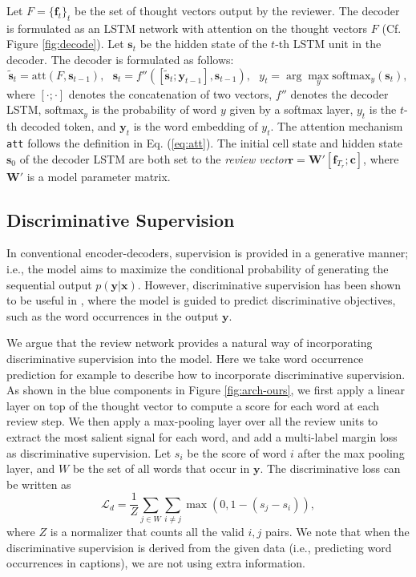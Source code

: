 \documentclass{article}
\begin{document}
Let $F = \{\mathbf{f}_t\}_t$ be the set of thought vectors output by the reviewer. The decoder is formulated as an LSTM network with attention on the thought vectors $F$ (Cf. Figure \ref{fig:decode}). Let $\mathbf{s}_t$ be the hidden state of the $t$-th LSTM unit in the decoder. The decoder is formulated as follows:
\begin{equation}
\tilde{\mathbf{s}}_t = \mbox{att}(F, \mathbf{s}_{t - 1}), ~~~ \mathbf{s}_t = f''([\tilde{\mathbf{s}}_t; \mathbf{y}_{t - 1}], \mathbf{s}_{t - 1}), ~~~ y_t = \arg \max_y \mbox{softmax}_y(\mathbf{s}_t),
\label{eq:loss}
\end{equation}
where $[\cdot; \cdot]$ denotes the concatenation of two vectors, $f''$ denotes the decoder LSTM, $\mbox{softmax}_y$ is the probability of word $y$ given by a softmax layer, $y_t$ is the $t$-th decoded token, and $\mathbf{y}_t$ is the word embedding of $y_t$. The attention mechanism \texttt{att} follows the definition in Eq. (\ref{eq:att}). The initial cell state and hidden state $\mathbf{s}_0$ of the decoder LSTM are both set to the \textit{review vector}$\mathbf{r} = \mathbf{W}'[\mathbf{f}_{T_r}; \mathbf{c}]$, where $\mathbf{W}'$ is a model parameter matrix.

\subsection{Discriminative Supervision}

In conventional encoder-decoders, supervision is provided in a generative manner; i.e., the model aims to maximize the conditional probability of generating the sequential output $p(\mathbf{y} | \mathbf{x})$. However, discriminative supervision has been shown to be useful in \cite{fang2015captions}, where the model is guided to predict discriminative objectives, such as the word occurrences in the output $\mathbf{y}$.

We argue that the review network provides a natural way of incorporating discriminative supervision into the model. Here we take word occurrence prediction for example to describe how to incorporate discriminative supervision. As shown in the blue components in Figure \ref{fig:arch-ours}, we first apply a linear layer on top of the thought vector to compute a score for each word at each review step. We then apply a max-pooling layer over all the review units to extract the most salient signal for each word, and add a multi-label margin loss as discriminative supervision. Let $s_{i}$ be the score of word $i$ after the max pooling layer, and $W$ be the set of all words that occur in $\mathbf{y}$. The discriminative loss can be written as
\begin{equation}
\mathcal{L}_d = \frac{1}{Z} \sum_{j \in W} \sum_{i \not= j} \max(0, 1 - (s_j - s_i)),
\label{eq:d-loss}
\end{equation}
where $Z$ is a normalizer that counts all the valid $i, j$ pairs. We note that when the discriminative supervision is derived from the given data (i.e., predicting word occurrences in captions), we are not using extra information.
\end{document}
